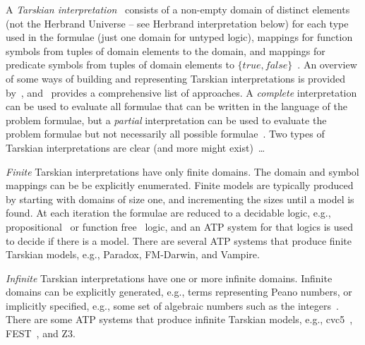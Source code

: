 \documentclass{easychair}
\newenvironment{packed_itemize}{
\vspace*{-0.3em}
\begin{itemize}
\setlength{\partopsep}{0pt}
\setlength{\itemsep}{1pt}
\setlength{\parskip}{0pt}
\setlength{\parsep}{0pt}
}{\end{itemize}}
\begin{document}
A \emph{Tarskian interpretation}~\cite{TV56} consists of a non-empty domain of distinct elements 
(not the Herbrand Universe -- see Herbrand interpretation below) for each type used in the 
formulae (just one domain for untyped logic), mappings for function symbols from tuples of 
domain elements to the domain, and mappings for predicate symbols from tuples of domain elements 
to $\{true,false\}$~\cite{Hun96,Gal15}.
An overview of some ways of building and representing Tarskian interpretations is provided 
by~\cite{CLP04}, and~\cite{Pel03-EQMC} provides a comprehensive list of approaches.
A \emph{complete} interpretation can be used to evaluate all formulae that can be written in the 
language of the problem formulae, but a \emph{partial} interpretation can be used to evaluate the
problem formulae but not necessarily all possible formulae~\cite{BSW23}.
Two types of Tarskian interpretations are clear (and more might exist)~\ldots
\begin{packed_itemize}
\item \emph{Finite} Tarskian interpretations have only finite domains.
      The domain and symbol mappings can be be explicitly enumerated.
      Finite models are typically produced by starting with domains of size one, and incrementing 
      the sizes until a model is found.
      At each iteration the formulae are reduced to a decidable logic, e.g., 
      propositional~\cite{CS03,McC03-MACE4-TR} or function free~\cite{BF+09} logic, and an ATP 
      system for that logics is used to decide if there is a model.
      There are several ATP systems that produce finite Tarskian models, e.g., Paradox, FM-Darwin, 
      and Vampire.
\item \emph{Infinite} Tarskian interpretations have one or more infinite domains.
      Infinite domains can be explicitly generated, e.g., terms representing Peano numbers, or 
      implicitly specified, e.g., some set of algebraic numbers such as the integers~\cite{BB13}.
      There are some ATP systems that produce infinite Tarskian models, e.g., 
      cvc5~\cite{BB+22-cvc5}, FEST~\cite{EPS24}, and Z3.
\end{packed_itemize}
\end{document}
